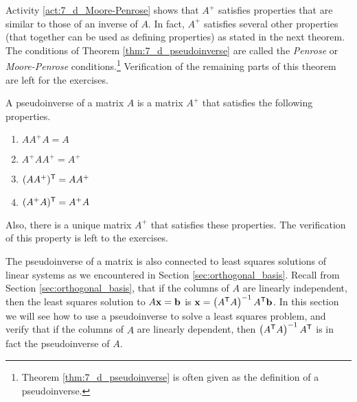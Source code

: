 Activity \ref{act:7_d_Moore-Penrose} shows that $A^{+}$ satisfies properties that are similar to those of an inverse of $A$. In fact, $A^{+}$ satisfies several other properties (that together can be used as defining properties) as stated in the next theorem. The conditions of Theorem \ref{thm:7_d_pseudoinverse} are called the \emph{Penrose} or \emph{Moore-Penrose} conditions.\footnote{Theorem \ref{thm:7_d_pseudoinverse} is often given as the definition of a pseudoinverse.} Verification of the remaining parts of this theorem are left for the exercises. 


\begin{theorem} \label{thm:7_d_pseudoinverse} A pseudoinverse of a matrix $A$ is a matrix $A^+$ that satisfies the following properties. 
\begin{enumerate}
\item $AA^{+}A = A$
\item $A^{+}AA^{+} = A^{+}$
\item $(AA^{+})^{\mathsf{T}} = AA^{+}$
\item $(A^{+}A)^{\mathsf{T}} = A^{+}A$
\end{enumerate}
\end{theorem} 
Also, there is a unique matrix $A^+$ that satisfies these properties. The verification of this property is left to the exercises. 



The pseudoinverse of a matrix is also connected to least squares solutions of linear systems as we encountered in Section \ref{sec:orthogonal_basis}. Recall from Section \ref{sec:orthogonal_basis}, that if the columns of $A$ are linearly independent, then the least squares solution to $A\mathbf{x} = \mathbf{b}$ is $\mathbf{x} = \left(A^{\mathsf{T}}A\right)^{-1}A^{\mathsf{T}} \mathbf{b}$. In this section we will see how to use a pseudoinverse to solve a least squares problem, and verify that if the columns of $A$ are linearly dependent, then $ \left(A^{\mathsf{T}}A\right)^{-1}A^{\mathsf{T}}$ is in fact the pseudoinverse of $A$.  

